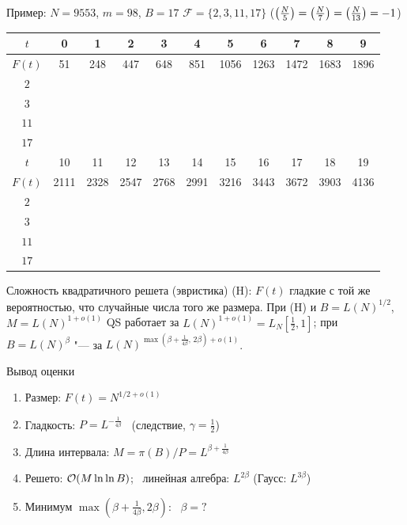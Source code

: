 \documentclass{ca-slides}
\begin{document}
\begin{canvasframe}[shrink=5]{Пример: $N = 9553$, $m = 98$, $B = 17$}
  $\mathcal F = \{2, 3, 11, 17\}$ \quad ($\left(\frac{N}{5}\right) = \left(\frac{N}{7}\right) = \left(\frac{N}{13}\right) = -1$)
  \par\smallskip
  \small
  \renewcommand{\arraystretch}{1.15}
  \begin{tabular}{c|*{10}{c}}
    $t$ & 0 & 1 & 2 & 3 & 4 & 5 & 6 & 7 & 8 & 9 \\ \hline
    $F(t)$ & 51 & 248 & 447 & 648 & 851 & 1056 & 1263 & 1472 & 1683 & 1896 \\
    $2$ & & & & & & & & & & \\
    $3$ & & & & & & & & & & \\
    $11$ & & & & & & & & & & \\
    $17$ & & & & & & & & & & \\ \hline
    $t$ & 10 & 11 & 12 & 13 & 14 & 15 & 16 & 17 & 18 & 19 \\ \hline
    $F(t)$ & 2111 & 2328 & 2547 & 2768 & 2991 & 3216 & 3443 & 3672 & 3903 & 4136 \\
    $2$ & & & & & & & & & & \\
    $3$ & & & & & & & & & & \\
    $11$ & & & & & & & & & & \\
    $17$ & & & & & & & & & &
  \end{tabular}
\end{canvasframe}

\begin{theoremframe}{Сложность квадратичного решета (эвристика)}
  (H): $F(t)$ гладкие с той же вероятностью, что случайные числа того же размера.
  При (H) и $B = L(N)^{1/2}$, $M = L(N)^{1 + o(1)}$ QS работает за
  $L(N)^{1 + o(1)} = L_N[\frac12, 1]$; при $B = L(N)^{\beta}$ "--- за
  $L(N)^{\max(\beta + \frac{1}{4\beta},\, 2\beta) + o(1)}$.
\end{theoremframe}

\begin{canvasframe}{Вывод оценки}
  \begin{enumerate}
    \item Размер: $F(t) = N^{1/2 + o(1)}$
    \item Гладкость: $P = L^{-\frac{1}{4\beta}}$ \ (следствие, $\gamma = \frac12$)
    \item Длина интервала: $M = \pi(B)/P = L^{\beta + \frac{1}{4\beta}}$
    \item Решето: $\mathcal{O}(M \ln\ln B)$; \ линейная алгебра: $L^{2\beta}$ (Гаусс: $L^{3\beta}$)
    \item Минимум $\max(\beta + \frac{1}{4\beta}, 2\beta)$: \ $\beta = ?$
  \end{enumerate}
  \vfill
\end{canvasframe}
\end{document}
